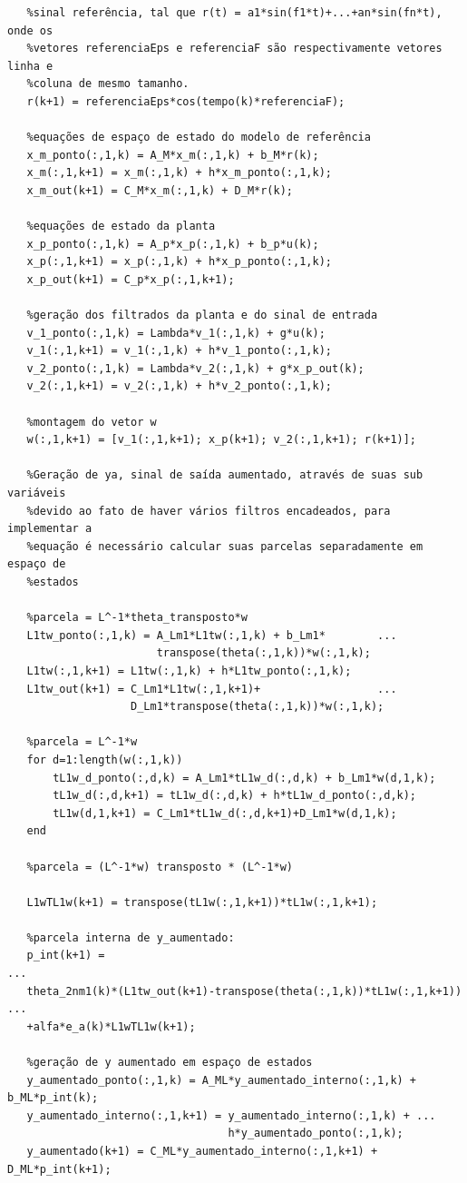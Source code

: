 \documentclass[11pt]{report}
\begin{document}
\begin{verbatim}
   %sinal referência, tal que r(t) = a1*sin(f1*t)+...+an*sin(fn*t), onde os
   %vetores referenciaEps e referenciaF são respectivamente vetores linha e
   %coluna de mesmo tamanho. 
   r(k+1) = referenciaEps*cos(tempo(k)*referenciaF);
   
   %equações de espaço de estado do modelo de referência
   x_m_ponto(:,1,k) = A_M*x_m(:,1,k) + b_M*r(k);
   x_m(:,1,k+1) = x_m(:,1,k) + h*x_m_ponto(:,1,k);
   x_m_out(k+1) = C_M*x_m(:,1,k) + D_M*r(k);
   
   %equações de estado da planta
   x_p_ponto(:,1,k) = A_p*x_p(:,1,k) + b_p*u(k);
   x_p(:,1,k+1) = x_p(:,1,k) + h*x_p_ponto(:,1,k);
   x_p_out(k+1) = C_p*x_p(:,1,k+1);
   
   %geração dos filtrados da planta e do sinal de entrada
   v_1_ponto(:,1,k) = Lambda*v_1(:,1,k) + g*u(k);
   v_1(:,1,k+1) = v_1(:,1,k) + h*v_1_ponto(:,1,k);
   v_2_ponto(:,1,k) = Lambda*v_2(:,1,k) + g*x_p_out(k);
   v_2(:,1,k+1) = v_2(:,1,k) + h*v_2_ponto(:,1,k);
   
   %montagem do vetor w
   w(:,1,k+1) = [v_1(:,1,k+1); x_p(k+1); v_2(:,1,k+1); r(k+1)];
   
   %Geração de ya, sinal de saída aumentado, através de suas sub variáveis
   %devido ao fato de haver vários filtros encadeados, para implementar a
   %equação é necessário calcular suas parcelas separadamente em espaço de
   %estados
   
   %parcela = L^-1*theta_transposto*w
   L1tw_ponto(:,1,k) = A_Lm1*L1tw(:,1,k) + b_Lm1*        ...
                       transpose(theta(:,1,k))*w(:,1,k);
   L1tw(:,1,k+1) = L1tw(:,1,k) + h*L1tw_ponto(:,1,k);
   L1tw_out(k+1) = C_Lm1*L1tw(:,1,k+1)+                  ...
                   D_Lm1*transpose(theta(:,1,k))*w(:,1,k);
   
   %parcela = L^-1*w
   for d=1:length(w(:,1,k))
       tL1w_d_ponto(:,d,k) = A_Lm1*tL1w_d(:,d,k) + b_Lm1*w(d,1,k);
       tL1w_d(:,d,k+1) = tL1w_d(:,d,k) + h*tL1w_d_ponto(:,d,k);
       tL1w(d,1,k+1) = C_Lm1*tL1w_d(:,d,k+1)+D_Lm1*w(d,1,k);
   end
   
   %parcela = (L^-1*w) transposto * (L^-1*w)
   
   L1wTL1w(k+1) = transpose(tL1w(:,1,k+1))*tL1w(:,1,k+1);
   
   %parcela interna de y_aumentado:
   p_int(k+1) =                                                           ...
   theta_2nm1(k)*(L1tw_out(k+1)-transpose(theta(:,1,k))*tL1w(:,1,k+1))    ...
   +alfa*e_a(k)*L1wTL1w(k+1);
   
   %geração de y aumentado em espaço de estados
   y_aumentado_ponto(:,1,k) = A_ML*y_aumentado_interno(:,1,k) + b_ML*p_int(k);
   y_aumentado_interno(:,1,k+1) = y_aumentado_interno(:,1,k) + ...
                                  h*y_aumentado_ponto(:,1,k);
   y_aumentado(k+1) = C_ML*y_aumentado_interno(:,1,k+1) + D_ML*p_int(k+1);
   

\end{verbatim}
\end{document}
